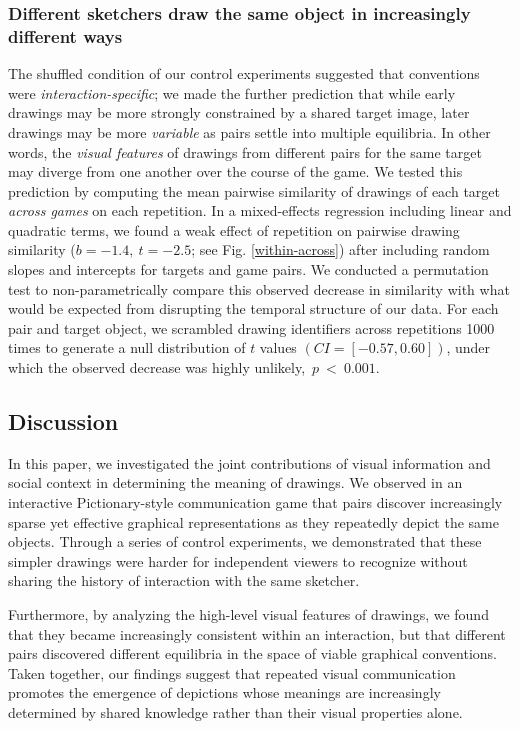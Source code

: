 \documentclass[10pt,letterpaper]{article}
\begin{document}
\subsubsection{Different sketchers draw the same object in increasingly different ways}

The shuffled condition of our control experiments suggested that conventions were \emph{interaction-specific}; we made the further prediction that while early drawings may be more strongly constrained by a shared target image, later drawings may be more \emph{variable} as pairs settle into multiple equilibria.
In other words, the \emph{visual features} of drawings from different pairs for the same target may diverge from one another over the course of the game.
We tested this prediction by computing the mean pairwise similarity of drawings of each target \emph{across games} on each repetition.
In a mixed-effects regression including linear and quadratic terms, we found a weak effect of repetition on pairwise drawing similarity ($b = -1.4, ~t = -2.5$; see Fig. \ref{within-across})  after including random slopes and intercepts for targets and game pairs. %
We conducted a permutation test to non-parametrically compare this observed decrease in similarity with what would be expected from disrupting the temporal structure of our data.
For each pair and target object, we scrambled drawing identifiers across repetitions 1000 times to generate a null distribution of $t$ values $(CI = [-0.57, 0.60])$, under which the observed decrease was highly unlikely,~$p~<~0.001$.


\subsection{Discussion}

In this paper, we investigated the joint contributions of visual information and social context in determining the meaning of drawings.
We observed in an interactive Pictionary-style communication game that pairs discover increasingly sparse yet effective graphical representations as they repeatedly depict the same objects.
Through a series of control experiments, we demonstrated that these simpler drawings were harder for independent viewers to recognize without sharing the history of interaction with the same sketcher.

Furthermore, by analyzing the high-level visual features of drawings, we found that they became increasingly consistent within an interaction, but that different pairs discovered different equilibria in the space of viable graphical conventions. 
Taken together, our findings suggest that repeated visual communication promotes the emergence of depictions whose meanings are increasingly determined by shared knowledge rather than their visual properties alone.
\end{document}

